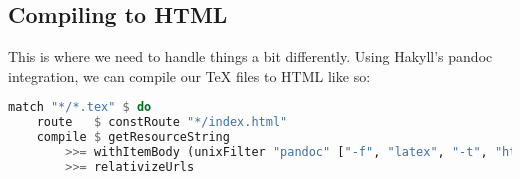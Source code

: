 \subsection{Compiling to HTML}
This is where we need to handle things a bit differently.
Using Hakyll's pandoc integration, we can compile our TeX files to HTML like so:
\begin{lstlisting}[language=haskell]
match "*/*.tex" $ do
    route   $ constRoute "*/index.html"
    compile $ getResourceString
        >>= withItemBody (unixFilter "pandoc" ["-f", "latex", "-t", "html5","--mathjax"])
        >>= relativizeUrls
\end{lstlisting}